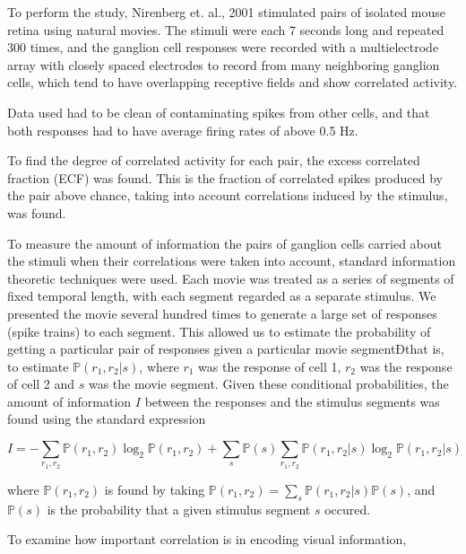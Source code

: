 \documentclass[twoside]{article}
\begin{document}
\begin{multicols}{2}
To perform the study, Nirenberg et. al., 2001 stimulated pairs of isolated mouse retina using natural movies. The stimuli were each 7 seconds long and repeated 300 times, and the ganglion cell responses were recorded with a multielectrode array with closely spaced electrodes to record from many neighboring ganglion cells, which tend to have overlapping receptive fields and show correlated activity. 

Data used had to be clean of contaminating spikes from other cells, and that both responses had to have average firing rates of above 0.5 Hz. 

To find the degree of correlated activity for each pair, the excess correlated fraction (ECF) was found. This is the fraction of correlated spikes produced by the pair above chance, taking into account correlations induced by the stimulus, was found. 

To measure the amount of information the pairs of ganglion cells carried about the stimuli when their correlations were taken into account, standard information theoretic techniques were used. Each movie was treated as a series of segments of fixed temporal length, with each segment regarded as a separate stimulus. We presented the movie several hundred times to generate a large set of responses (spike trains) to each segment. This allowed us to estimate the probability of getting a particular pair of responses given a particular movie segmentÐthat is, to estimate $\mathbb{P}(r_1,r_2|s)$, where $r_1$ was the response of cell 1, $r_2$ was the response of cell 2 and $s$ was the movie segment. Given these conditional probabilities, the amount of information $I$ between the responses and the stimulus segments was found using the standard expression

\begin{equation}
	\label{eq:ganglion-info}
	I = -\sum_{r_1,r_2}\mathbb{P}(r_1,r_2)\log_2\mathbb{P}(r_1,r_2)
		+\sum_s\mathbb{P}(s) \sum_{r_1,r_2}\mathbb{P}(r_1,r_2|s)\log_2\mathbb{P}(r_1,r_2|s)
\end{equation}

where $\mathbb{P}(r_1,r_2)$ is found by taking $\mathbb{P}(r_1,r_2) = \sum_s \mathbb{P}(r_1,r_2|s)\mathbb{P}(s)$, and $\mathbb{P}(s)$ is the probability that a given stimulus segment $s$ occured. 

To examine how important correlation is in encoding visual information, 





\end{multicols}
\end{document}
